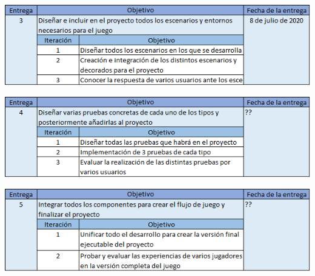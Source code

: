 \begin{center}
\includegraphics[width=1\textwidth]{03.EstudioProblema/05.PlanEntregas/00.Figuras/03.entrega_3.png}
\end{center}

\begin{center}
\includegraphics[width=1\textwidth]{03.EstudioProblema/05.PlanEntregas/00.Figuras/04.entrega_4.png}
\end{center}

\begin{center}
\includegraphics[width=1\textwidth]{03.EstudioProblema/05.PlanEntregas/00.Figuras/05.entrega_5.png}
\end{center}

\chapterend